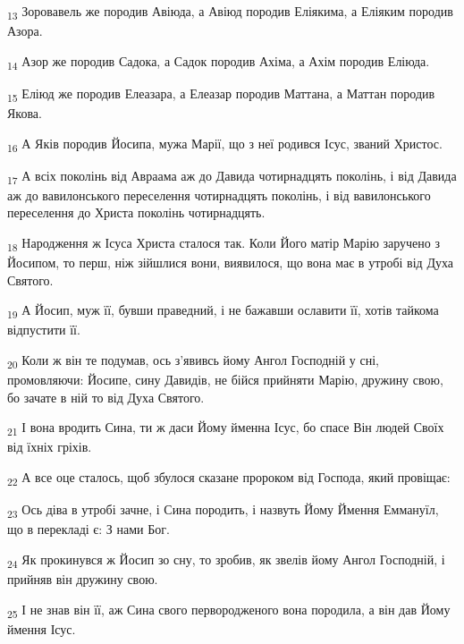\begin{tcolorbox}
\textsubscript{13} Зоровавель же породив Авіюда, а Авіюд породив Еліякима, а Еліяким породив Азора.
\end{tcolorbox}
\begin{tcolorbox}
\textsubscript{14} Азор же породив Садока, а Садок породив Ахіма, а Ахім породив Еліюда.
\end{tcolorbox}
\begin{tcolorbox}
\textsubscript{15} Еліюд же породив Елеазара, а Елеазар породив Маттана, а Маттан породив Якова.
\end{tcolorbox}
\begin{tcolorbox}
\textsubscript{16} А Яків породив Йосипа, мужа Марії, що з неї родився Ісус, званий Христос.
\end{tcolorbox}
\begin{tcolorbox}
\textsubscript{17} А всіх поколінь від Авраама аж до Давида чотирнадцять поколінь, і від Давида аж до вавилонського переселення чотирнадцять поколінь, і від вавилонського переселення до Христа поколінь чотирнадцять.
\end{tcolorbox}
\begin{tcolorbox}
\textsubscript{18} Народження ж Ісуса Христа сталося так. Коли Його матір Марію заручено з Йосипом, то перш, ніж зійшлися вони, виявилося, що вона має в утробі від Духа Святого.
\end{tcolorbox}
\begin{tcolorbox}
\textsubscript{19} А Йосип, муж її, бувши праведний, і не бажавши ославити її, хотів тайкома відпустити її.
\end{tcolorbox}
\begin{tcolorbox}
\textsubscript{20} Коли ж він те подумав, ось з'явивсь йому Ангол Господній у сні, промовляючи: Йосипе, сину Давидів, не бійся прийняти Марію, дружину свою, бо зачате в ній то від Духа Святого.
\end{tcolorbox}
\begin{tcolorbox}
\textsubscript{21} І вона вродить Сина, ти ж даси Йому йменна Ісус, бо спасе Він людей Своїх від їхніх гріхів.
\end{tcolorbox}
\begin{tcolorbox}
\textsubscript{22} А все оце сталось, щоб збулося сказане пророком від Господа, який провіщає:
\end{tcolorbox}
\begin{tcolorbox}
\textsubscript{23} Ось діва в утробі зачне, і Сина породить, і назвуть Йому Ймення Еммануїл, що в перекладі є: З нами Бог.
\end{tcolorbox}
\begin{tcolorbox}
\textsubscript{24} Як прокинувся ж Йосип зо сну, то зробив, як звелів йому Ангол Господній, і прийняв він дружину свою.
\end{tcolorbox}
\begin{tcolorbox}
\textsubscript{25} І не знав він її, аж Сина свого первородженого вона породила, а він дав Йому ймення Ісус.
\end{tcolorbox}
